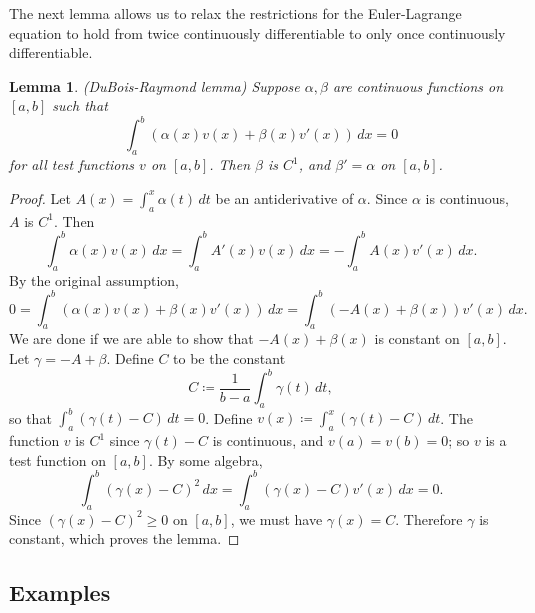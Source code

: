 \documentclass[11pt]{book}
\newtheorem{lemma}{Lemma}[subsection]
\begin{document}
The next lemma allows us to relax the restrictions for the Euler-Lagrange equation to hold from twice continuously differentiable to only once continuously differentiable.
\begin{lemma}
(DuBois-Raymond lemma) Suppose $\alpha, \beta$ are continuous functions on $[a,b]$ such that
\[
\int_a^b ( \alpha(x)v(x) + \beta(x)v'(x) ) \, dx = 0
\]
for all test functions $v$ on $[a,b]$. Then $\beta$ is $C^1$, and $\beta' = \alpha$ on $[a,b]$.
\end{lemma}
\begin{proof}
Let $A(x) = \int_a^x \alpha(t) \, dt$ be an antiderivative of $\alpha$. Since $\alpha$ is continuous, $A$ is $C^1$. Then
\[
\int_a^b \alpha(x) v(x) \, dx = \int_a^b A'(x)v(x) \, dx = -\int_a^b A(x)v'(x) \, dx.
\]
By the original assumption,
\[
0 = \int_a^b (\alpha(x)v(x) + \beta(x)v'(x)) \, dx = \int_a^b(-A(x) + \beta(x))v'(x) \, dx.
\]
We are done if we are able to show that $-A(x) + \beta(x)$ is constant on $[a,b]$. Let $\gamma = -A + \beta$. Define $C$ to be the constant
\[
C \coloneqq \frac{1}{b-a}\int_a^b \gamma(t) \, dt,
\]
so that $\int_a^b (\gamma(t) - C) \, dt = 0$. Define $v(x) \coloneqq \int_a^x (\gamma(t) - C) \, dt$. The function $v$ is $C^1$ since $\gamma(t) - C$ is continuous, and $v(a) = v(b) = 0$; so $v$ is a test function on $[a,b]$. By some algebra,
\[
\int_a^b (\gamma(x) - C)^2 \, dx = \int_a^b (\gamma(x) - C)v'(x) \, dx = 0.
\]
Since $(\gamma(x) - C)^2 \geq 0$ on $[a,b]$, we must have $\gamma(x) = C$. Therefore $\gamma$ is constant, which proves the lemma.
\end{proof}

\subsection{Examples}
\end{document}
